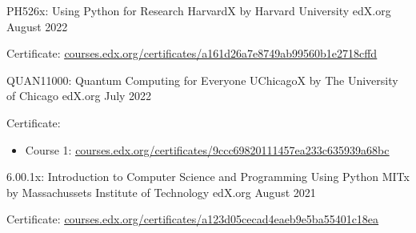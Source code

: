 

\begin{cventries}

  \cventry
  {PH526x: Using Python for Research} %
  {HarvardX by Harvard University} %
  {edX.org} %
  {August 2022} %
  {
    \begin{cvitems} %
      \item{Certificate: \href{https://courses.edx.org/certificates/a161d26a7e8749ab99560b1e2718cffd}{\underline{courses.edx.org/certificates/a161d26a7e8749ab99560b1e2718cffd}}}
    \end{cvitems}
  }

  \cventry
    { QUAN11000: Quantum Computing for Everyone} %
    {UChicagoX by The University of Chicago} %
    {edX.org} %
    {July 2022} %
    {
      \begin{cvitems} %
        \item{Certificate: 
          \begin{itemize}
            \item{Course 1: \href{https://courses.edx.org/certificates/9ccc69820111457ea233c635939a68bc}{\underline{courses.edx.org/certificates/9ccc69820111457ea233c635939a68bc}}}
          \end{itemize}  
        }
      \end{cvitems}
    }

  \cventry
    {6.00.1x: Introduction to Computer Science and Programming Using Python} %
    {MITx by Massachussets Institute of Technology} %
    {edX.org} %
    {August 2021} %
    {
      \begin{cvitems} %
        \item{Certificate: \href{https://courses.edx.org/certificates/a123d05cecad4eaeb9e5ba55401c18ea}{\underline{courses.edx.org/certificates/a123d05cecad4eaeb9e5ba55401c18ea}}}
      \end{cvitems}
    }

\end{cventries}
